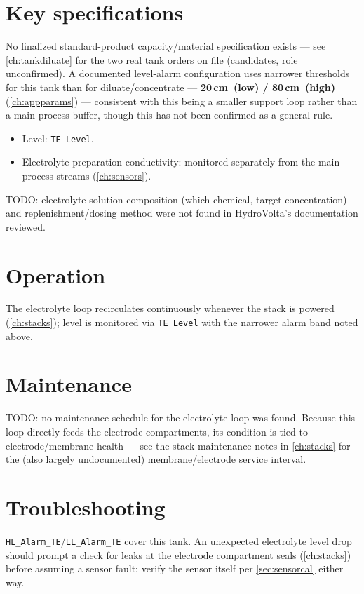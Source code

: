 \documentclass[a4paper,11pt,twoside,openright,numbers=noenddot]{scrreprt}
\newcommand{\plctag}[1]{\texttt{\small #1}}
\begin{document}
\section{Key specifications}
No finalized standard-product capacity/material specification exists ---
see \cref{ch:tankdiluate} for the two real tank orders on file (candidates,
role unconfirmed). A documented level-alarm configuration uses narrower
thresholds for this tank than for diluate/concentrate ---
\textbf{20\,cm~(low) / 80\,cm~(high)} (\cref{ch:appparams}) --- consistent
with this being a smaller support loop rather than a main process buffer,
though this has not been confirmed as a general rule.
\begin{itemize}
\item Level: \plctag{TE\_Level}.
\item Electrolyte-preparation conductivity: monitored separately from the
  main process streams (\cref{ch:sensors}).
\end{itemize}
TODO: electrolyte solution composition (which chemical, target
concentration) and replenishment/dosing method were not found in
HydroVolta's documentation reviewed.

\section{Operation}
The electrolyte loop recirculates continuously whenever the stack is
powered (\cref{ch:stacks}); level is monitored via \plctag{TE\_Level}
with the narrower alarm band noted above.

\section{Maintenance}
TODO: no maintenance schedule for the electrolyte loop was found. Because
this loop directly feeds the electrode compartments, its condition is
tied to electrode/membrane health --- see the stack maintenance notes in
\cref{ch:stacks} for the (also largely undocumented) membrane/electrode
service interval.

\section{Troubleshooting}
\plctag{HL\_Alarm\_TE}/\plctag{LL\_Alarm\_TE} cover this tank. An
unexpected electrolyte level drop should prompt a check for leaks at the
electrode compartment seals (\cref{ch:stacks}) before assuming a sensor
fault; verify the sensor itself per \cref{sec:sensorcal} either way.
\end{document}
